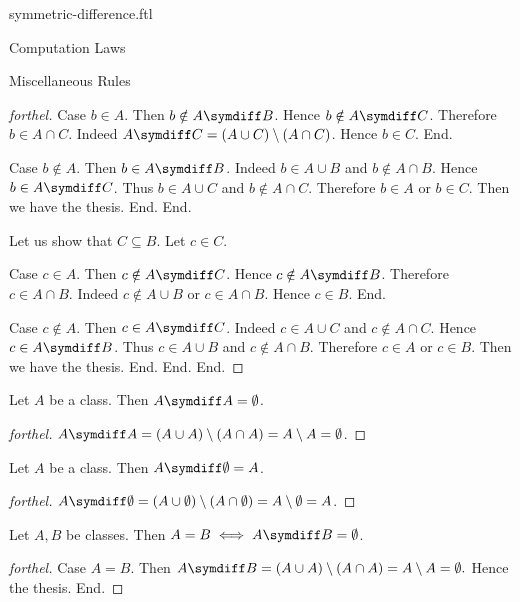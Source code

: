 \documentclass{naproche-library}
\begin{document}
\begin{smodule}[title=Symmetric Difference]{symmetric-difference.ftl}
\begin{sfragment}{Computation Laws}
\begin{sfragment}{Miscellaneous Rules}
\begin{proof}[forthel]
          Case $b \in A$.
            Then $b \notin A \symdiff B$.
            Hence $b \notin A \symdiff C$.
            Therefore $b \in A \cap C$.
            Indeed $A \symdiff C = (A \cup C) \setminus (A \cap C)$.
            Hence $b \in C$.
          End.

          Case $b \notin A$.
            Then $b \in A \symdiff B$.
            Indeed $b \in A \cup B$ and $b \notin A \cap B$.
            Hence $b \in A \symdiff C$.
            Thus $b \in A \cup C$ and $b \notin A \cap C$.
            Therefore $b \in A$ or $b \in C$.
            Then we have the thesis.
          End.
        End.

        Let us show that $C \subseteq B$.
          Let $c \in C$.

          Case $c \in A$.
            Then $c \notin A \symdiff C$.
            Hence $c \notin A \symdiff B$.
            Therefore $c \in A \cap B$.
            Indeed $c \notin A \cup B$ or $c \in A \cap B$.
            Hence $c \in B$.
          End.

          Case $c \notin A$.
            Then $c \in A \symdiff C$.
            Indeed $c \in A \cup C$ and $c \notin A \cap C$.
            Hence $c \in A \symdiff B$.
            Thus $c \in A \cup B$ and $c \notin A \cap B$.
            Therefore $c \in A$ or $c \in B$.
            Then we have the thesis.
          End.
        End.
      End.
    \end{proof}

    \begin{proposition}[forthel,id=FOUNDATIONS_03_4578696040022016]
      Let $A$ be a class.
      Then $A \symdiff A = \emptyset$.
    \end{proposition}
    \begin{proof}[forthel]
      $A \symdiff A
        = (A \cup A) \setminus (A \cap A)
        = A \setminus A
        = \emptyset$.
    \end{proof}

    \begin{proposition}[forthel,id=FOUNDATIONS_03_6698730398941184]
      Let $A$ be a class.
      Then $A \symdiff \emptyset = A$.
    \end{proposition}
    \begin{proof}[forthel]
      $A \symdiff \emptyset
        = (A \cup \emptyset) \setminus (A \cap \emptyset)
        = A \setminus \emptyset
        = A$.
    \end{proof}

    \begin{proposition}[forthel,id=FOUNDATIONS_03_6111806917443584]
      Let $A, B$ be classes.
      Then $A = B \iff A \symdiff B = \emptyset$.
    \end{proposition}
    \begin{proof}[forthel]
      Case $A = B$.
        Then $A \symdiff B
          = (A \cup A) \setminus (A \cap A)
          = A \setminus A
          = \emptyset.$
        Hence the thesis.
      End.


\end{proof}
\end{sfragment}
\end{sfragment}
\end{smodule}
\end{document}
